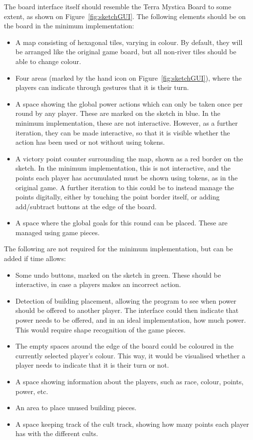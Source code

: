 The board interface itself should resemble the Terra Mystica Board to some extent, as shown on Figure~\ref{fig:sketchGUI}. The following elements should be on the board in the minimum implementation:
\begin{itemize}
\item A map consisting of hexagonal tiles, varying in colour. By default, they will be arranged like the original game board, but all non-river tiles should be able to change colour.
\item Four areas (marked by the hand icon on Figure~\ref{fig:sketchGUI}), where the players can indicate through gestures that it is their turn.
\item A space showing the global power actions which can only be taken once per round by any player. These are marked on the sketch in blue. In the minimum implementation, these are not interactive. However, as a further iteration, they can be made interactive, so that it is visible whether the action has been used or not without using tokens.
\item A victory point counter surrounding the map, shown as a red border on the sketch. In the minimum implementation, this is not interactive, and the points each player has accumulated must be shown using tokens, as in the original game. A further iteration to this could be to instead manage the points digitally, either by touching the point border itself, or adding add/subtract buttons at the edge of the board.
\item A space where the global goals for this round can be placed. These are managed using game pieces.
\end{itemize}

The following are not required for the minimum implementation, but can be added if time allows:
\begin{itemize}
\item Some undo buttons, marked on the sketch in green. These should be interactive, in case a players makes an incorrect action.
\item Detection of building placement, allowing the program to see when power should be offered to another player. The interface could then indicate that power needs to be offered, and in an ideal implementation, how much power. This would require shape recognition of the game pieces.
\item The empty spaces around the edge of the board could be coloured in the currently selected player's colour. This way, it would be visualised whether a player needs to indicate that it is their turn or not.
\item A space showing information about the players, such as race, colour, points, power, etc.
\item An area to place unused building pieces.
\item A space keeping track of the cult track, showing how many points each player has with the different cults.
\end{itemize}

